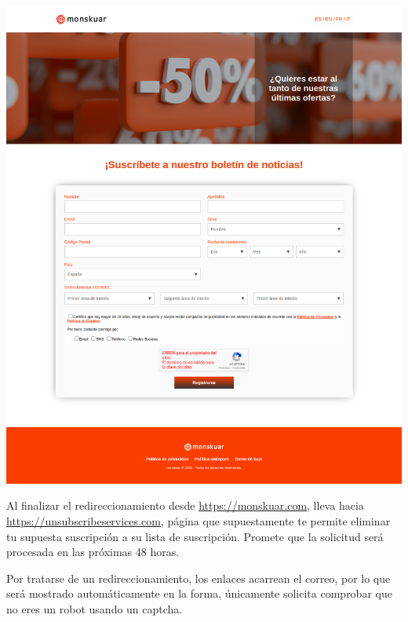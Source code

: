 \documentclass[11pt]{article}
\begin{document}
\begin{center}
\includegraphics[width=.9\linewidth]{./assets/screencapture-monskuar-2022-05-31-00_59_54.png}
\end{center}

Al finalizar el redireccionamiento desde \url{https://monskuar.com}, lleva hacia \url{https://unsubscribeservices.com}, página que supuestamente te permite eliminar tu supuesta suscripción a su lista de suscripción. Promete que la solicitud será procesada en las próximas 48 horas.

Por tratarse de un redireccionamiento, los enlaces acarrean el correo, por lo que será mostrado automáticamente en la forma, únicamente solicita comprobar que no eres un robot usando un captcha.
\end{document}
